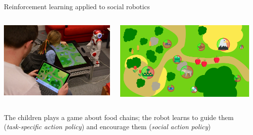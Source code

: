 \documentclass[xcolor=table]{beamer}
\begin{document}
{

\begin{frame}{Reinforcement learning applied to social robotics}

    \begin{columns}
        \begin{column}{0.5\linewidth}

            \includegraphics[width=\linewidth]{sparc/overview}

        \end{column}
        \begin{column}{0.5\linewidth}
            \includegraphics[width=\linewidth]{sparc/gui}
        \end{column}
    \end{columns}

    The children plays a game about food chains; the robot learns to guide them
    (\emph{task-specific action policy}) and encourage them (\emph{social action
    policy})


\end{frame}}
\end{document}
